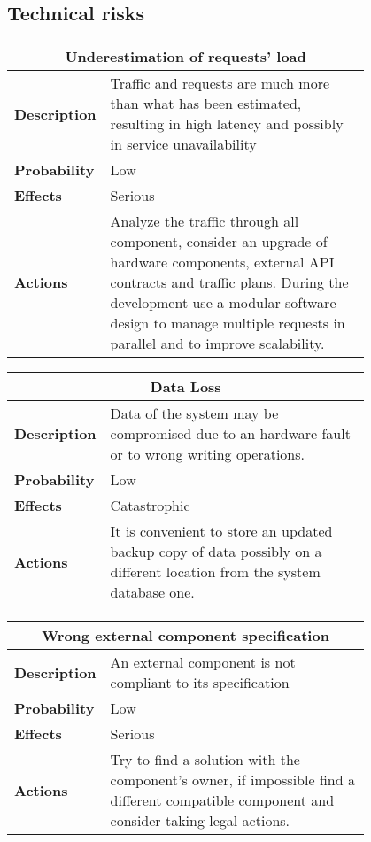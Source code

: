 \subsection{Technical risks}
\begin{longtable}{lp{0.8\linewidth}}
\multicolumn{2}{c}{\textbf{Underestimation of requests' load}}\\
\toprule
\textbf{Description}&Traffic and requests are much more than what has been estimated, resulting in high latency and possibly in service unavailability\\
\midrule
\textbf{Probability}&Low\\
\midrule
\textbf{Effects}&Serious\\
\midrule
\textbf{Actions}&Analyze the traffic through all component, consider an upgrade of hardware components, external API contracts and traffic plans. During the development use a modular software design to manage multiple requests in parallel and to improve scalability.\\
\bottomrule
\end{longtable}

\begin{longtable}{lp{0.8\linewidth}}
\multicolumn{2}{c}{\textbf{Data Loss}}\\
\toprule
\textbf{Description}&Data of the system may be compromised due to an hardware fault or to wrong writing operations.\\
\midrule
\textbf{Probability}&Low\\
\midrule
\textbf{Effects}&Catastrophic\\
\midrule
\textbf{Actions}&It is convenient to store an updated backup copy of data possibly on a different location from the system database one.\\
\bottomrule
\end{longtable}

\begin{longtable}{lp{0.8\linewidth}}
\multicolumn{2}{c}{\textbf{Wrong external component specification}}\\
\toprule
\textbf{Description}&An external component is not compliant to its specification\\
\midrule
\textbf{Probability}&Low\\
\midrule
\textbf{Effects}&Serious\\
\midrule
\textbf{Actions}&Try to find a solution with the component's owner, if impossible find a different compatible component and consider taking legal actions.\\
\bottomrule
\end{longtable}

